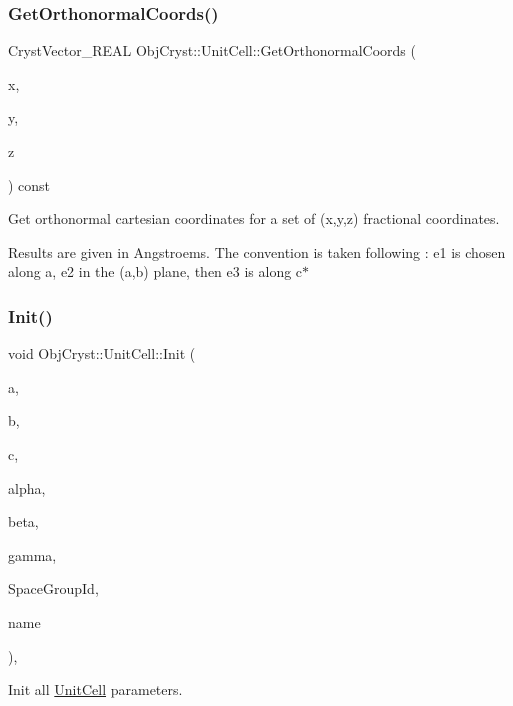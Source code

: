 \subsubsection{\texorpdfstring{GetOrthonormalCoords()}{GetOrthonormalCoords()}}
{\footnotesize\ttfamily Cryst\+Vector\+\_\+\+R\+E\+AL Obj\+Cryst\+::\+Unit\+Cell\+::\+Get\+Orthonormal\+Coords (\begin{DoxyParamCaption}\item[{const R\+E\+AL}]{x,  }\item[{const R\+E\+AL}]{y,  }\item[{const R\+E\+AL}]{z }\end{DoxyParamCaption}) const}



Get orthonormal cartesian coordinates for a set of (x,y,z) fractional coordinates. 

Results are given in Angstroems. The convention is taken following \+: e1 is chosen along a, e2 in the (a,b) plane, then e3 is along c$\ast$ \mbox{\label{class_obj_cryst_1_1_unit_cell_a5c2dd7255f5abe4292c3fd123bf8d005}} 
\subsubsection{\texorpdfstring{Init()}{Init()}}
{\footnotesize\ttfamily void Obj\+Cryst\+::\+Unit\+Cell\+::\+Init (\begin{DoxyParamCaption}\item[{const R\+E\+AL}]{a,  }\item[{const R\+E\+AL}]{b,  }\item[{const R\+E\+AL}]{c,  }\item[{const R\+E\+AL}]{alpha,  }\item[{const R\+E\+AL}]{beta,  }\item[{const R\+E\+AL}]{gamma,  }\item[{const string \&}]{Space\+Group\+Id,  }\item[{const string \&}]{name }\end{DoxyParamCaption})\hspace{0.3cm}{\ttfamily [protected]}, {\ttfamily [virtual]}}



Init all \mbox{\hyperlink{class_obj_cryst_1_1_unit_cell}{Unit\+Cell}} parameters. 


